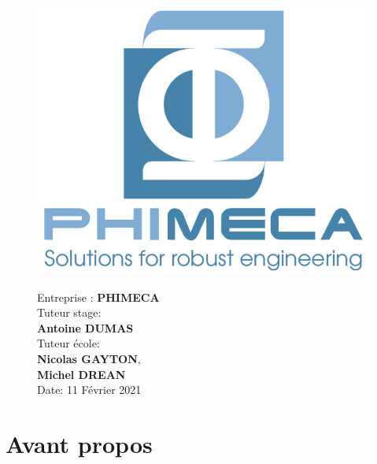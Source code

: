 \documentclass[a4paper,10pt]{article}
\begin{document}
\begin{titlepage}
		\begin{figure}[b]
		\vspace{-3cm}
			\begin{minipage}[c]{.55\textwidth}
				\hspace{-1cm}
				\includegraphics[width=\linewidth]{LogoPhiHaut.png}
			\end{minipage}
			\hfill
			\begin{minipage}[c]{.4\textwidth}
   				{\large Entreprise : \textbf{PHIMECA}}\\[0.5cm]
   				{\large Tuteur stage:\smallskip \\ \textbf{Antoine DUMAS}}\\[0.5cm]
   	 			{\large Tuteur école:\smallskip \\ \textbf{Nicolas GAYTON},\smallskip \\ \textbf{Michel DREAN}}\\[0.5cm]
   	 			{\large Date: 11 Février 2021}
			\end{minipage}
		\end{figure}   
   
   	\end{titlepage}
  
  
  \newpage   
   
   \tableofcontents
 
  \newpage
    
\section*{Avant propos}
\end{document}
